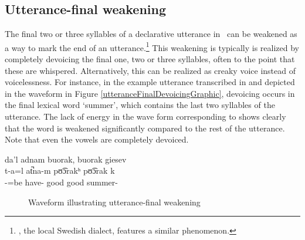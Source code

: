 \subsection{Utterance-final weakening}\label{utteranceFinalDevoicing}
The final two or three syllables of a declarative utterance in \PS\ can be weakened as a way to mark the end of an utterance.\footnote{, the local Swedish dialect, features a similar phenomenon.} 
This weakening is typically is realized by completely devoicing the final one, two or three syllables, often to the point that these are whispered. Alternatively, this can be realized as creaky voice instead of voicelessness. For instance, in the example utterance transcribed in  and depicted in the waveform in Figure \vref{utteranceFinalDevoicingGraphic}, devoicing occurs in the final lexical word  ‘summer’, which contains the last two syllables of the utterance. 
The lack of energy in the wave form corresponding to  shows clearly that the word is weakened significantly compared to the rest of the utterance. Note that even the vowels are completely devoiced.

\ea\label{utteranceFinalDevoicing1}%
\glll	da’l adnam buorak, buorak giesev\\
	t-a=l at̚na-m pʊ͡ɔrakʰ pʊ͡ɔrak k\\
	-=be\BS{} have- good good summer-\\\nopagebreak
{} 
\z
\begin{figure}
\caption{Waveform illustrating utterance-final weakening}\label{utteranceFinalDevoicingGraphic}
\end{figure}

